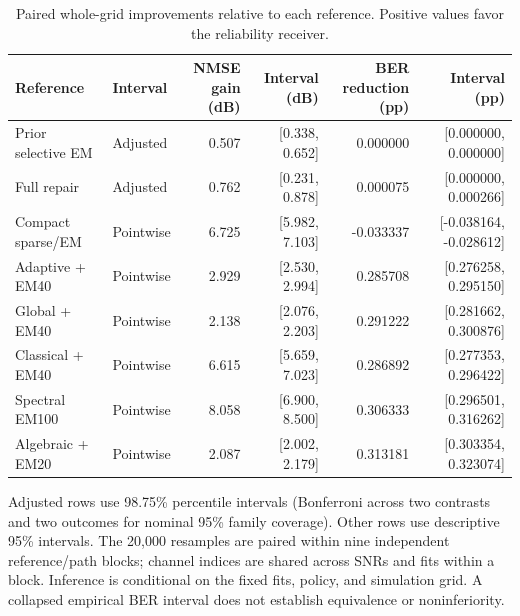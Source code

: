 \begin{table}[!t]
\centering
\caption{Paired whole-grid improvements relative to each reference. Positive values favor the reliability receiver.}
\label{tab:reliability-effects}
\small
\setlength{\tabcolsep}{4pt}
\begin{tabular}{llrrrr}
\toprule
Reference & Interval & \shortstack{NMSE gain\\(dB)} & Interval (dB) & \shortstack{BER reduction\\(pp)} & Interval (pp) \\
\midrule
Prior selective EM & Adjusted & 0.507 & [0.338, 0.652] & 0.000000 & [0.000000, 0.000000] \\
Full repair & Adjusted & 0.762 & [0.231, 0.878] & 0.000075 & [0.000000, 0.000266] \\
Compact sparse/EM & Pointwise & 6.725 & [5.982, 7.103] & -0.033337 & [-0.038164, -0.028612] \\
Adaptive + EM40 & Pointwise & 2.929 & [2.530, 2.994] & 0.285708 & [0.276258, 0.295150] \\
Global + EM40 & Pointwise & 2.138 & [2.076, 2.203] & 0.291222 & [0.281662, 0.300876] \\
Classical + EM40 & Pointwise & 6.615 & [5.659, 7.023] & 0.286892 & [0.277353, 0.296422] \\
Spectral EM100 & Pointwise & 8.058 & [6.900, 8.500] & 0.306333 & [0.296501, 0.316262] \\
Algebraic + EM20 & Pointwise & 2.087 & [2.002, 2.179] & 0.313181 & [0.303354, 0.323074] \\
\bottomrule
\end{tabular}
\par\vspace{2pt}
\begin{minipage}{0.98\textwidth}\footnotesize Adjusted rows use 98.75\% percentile intervals (Bonferroni across two contrasts and two outcomes for nominal 95\% family coverage). Other rows use descriptive 95\% intervals. The 20,000 resamples are paired within nine independent reference/path blocks; channel indices are shared across SNRs and fits within a block. Inference is conditional on the fixed fits, policy, and simulation grid. A collapsed empirical BER interval does not establish equivalence or noninferiority.\end{minipage}
\end{table}
